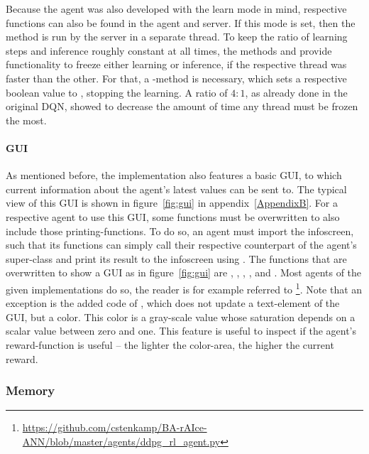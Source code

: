 Because the agent was also developed with the learn mode  in mind, respective functions can also be found in the agent and server. If this mode is set, then the method  is run by the server in a separate thread. To keep the ratio of learning steps and inference roughly constant at all times, the methods  and  provide functionality to freeze either learning or inference, if the respective thread was faster than the other. For that, a -method is necessary, which sets a respective boolean value to , stopping the learning. A ratio of $4:1$, as already done in the original DQN, showed to decrease the amount of time any thread must be frozen the most.


\paragraph{GUI}
\label{paragraph:gui}

As mentioned before, the implementation also features a basic GUI, to which current information about the agent's latest values can be sent to. The typical view of this GUI is shown in figure~\ref{fig:gui} in appendix~\ref{AppendixB}. For a respective agent to use this GUI, some functions must be overwritten to also include those printing-functions. To do so, an agent must import the infoscreen, such that its functions can simply call their respective counterpart of the agent's super-class and print its result to the infoscreen using . The functions that are overwritten to show a GUI as in figure~\ref{fig:gui} are , , , ,  and . Most agents of the given implementations do so, the reader is for example referred to \footnote{\url{https://github.com/cstenkamp/BA-rAIce-ANN/blob/master/agents/ddpg_rl_agent.py}}. Note that an exception is the added code of , which does not update a text-element of the GUI, but a color. This color is a gray-scale value whose saturation depends on a scalar value between zero and one. This feature is useful to inspect if the agent's reward-function is useful -- the lighter the color-area, the higher the current reward.

\subsubsection{Memory}

